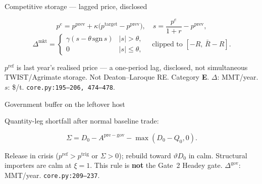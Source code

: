 \begin{frame}{Competitive storage --- lagged price, disclosed}

\[
p^e = p^{\mathrm{prev}} + \kappa\bigl(p^{\mathrm{target}}-p^{\mathrm{prev}}\bigr),
\quad
s = \frac{p^e}{1+r}-p^{\mathrm{prev}},
\]
\[
\Delta^{\mathrm{mkt}}
=
\begin{cases}
\gamma(s-\theta\,\mathrm{sgn}\,s) & |s|>\theta,\\
0 & |s|\le\theta,
\end{cases}
\quad\text{clipped to }[-R,\,\bar R-R].
\]

$p^{\mathrm{ref}}$ is last year's realised price --- a one-period lag,
disclosed, not simultaneous TWIST/Agrimate storage. Not Deaton--Laroque
RE. Category \textbf{E}.
{$\Delta$: MMT/year. $s$: \$/t.}
{\texttt{core.py:195--206, 474--478}.}
\end{frame}

\begin{frame}{Government buffer on the leftover host}

Quantity-leg shortfall after normal baseline trade:

\[
\Sigma = D_0 - A^{\mathrm{pre-gov}} - \max(D_0-Q_0,0).
\]

Release in crisis ($p^{\mathrm{ref}}>p^{\mathrm{trig}}$ or $\Sigma>0$);
rebuild toward $\vartheta D_0$ in calm. Structural importers are calm at
$\xi=1$. This rule is \textbf{not} the Gate~2 Headey gate.
{$\Delta^{\mathrm{gov}}$: MMT/year.}
{\texttt{core.py:209--237}.}
\end{frame}

